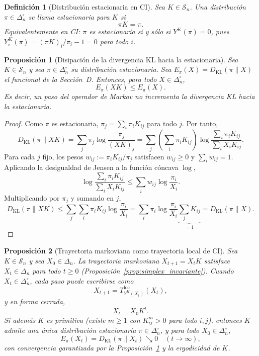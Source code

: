 ﻿\documentclass[12pt]{article}
\newtheorem{definicion}{Definición}[section]
\newtheorem{proposicion}{Proposición}[section]
\begin{document}
\begin{definicion}[Distribución estacionaria en CI]\label{def:estacionaria_CI}
Sea $K \in \mathcal{S}_n$. Una distribución $\pi \in \Delta_n^\circ$ se llama \emph{estacionaria} para $K$ si
\[
\pi K = \pi.
\]
Equivalentemente en CI: $\pi$ es estacionaria si y sólo si $Y^K(\pi) = 0$, pues $Y^K_i(\pi) = (\pi K)_i/\pi_i - 1 = 0$ para todo $i$.
\end{definicion}

\begin{proposicion}[Disipación de la divergencia KL hacia la estacionaria]\label{prop:disipacion_KL_markov}
Sea $K \in \mathcal{S}_n$ y sea $\pi \in \Delta_n^\circ$ su distribución estacionaria. Sea $E_\pi(X) = D_{\mathrm{KL}}(\pi \| X)$ el funcional de la Sección~D. Entonces, para todo $X \in \Delta_n^\circ$,
\[
E_\pi(XK) \leq E_\pi(X).
\]
Es decir, un paso del operador de Markov no incrementa la divergencia KL hacia la estacionaria.
\end{proposicion}

\begin{proof}
Como $\pi$ es estacionaria, $\pi_j = \sum_i \pi_i K_{ij}$ para todo $j$. Por tanto,
\[
D_{\mathrm{KL}}(\pi \| XK) = \sum_j \pi_j \log \frac{\pi_j}{(XK)_j} = \sum_j \left(\sum_i \pi_i K_{ij}\right) \log \frac{\sum_i \pi_i K_{ij}}{\sum_i X_i K_{ij}}.
\]
Para cada $j$ fijo, los pesos $w_{ij} := \pi_i K_{ij}/\pi_j$ satisfacen $w_{ij} \geq 0$ y $\sum_i w_{ij}=1$. Aplicando la desigualdad de Jensen a la función cóncava $\log$,
\[
\log \frac{\sum_i \pi_i K_{ij}}{\sum_i X_i K_{ij}} \leq \sum_i w_{ij} \log \frac{\pi_i}{X_i}.
\]
Multiplicando por $\pi_j$ y sumando en $j$,
\[
D_{\mathrm{KL}}(\pi\|XK) \leq \sum_j \sum_i \pi_i K_{ij} \log \frac{\pi_i}{X_i} = \sum_i \pi_i \log\frac{\pi_i}{X_i} \underbrace{\sum_j K_{ij}}_{=1} = D_{\mathrm{KL}}(\pi\|X).
\]
\end{proof}

\begin{proposicion}[Trayectoria markoviana como trayectoria local de CI]\label{prop:trayectoria_markov_CI}
Sea $K \in \mathcal{S}_n$ y sea $X_0 \in \Delta_n$. La trayectoria markoviana $X_{t+1} = X_t K$ satisface $X_t\in\Delta_n$ para todo $t\ge 0$ (Proposición~\ref{prop:simplex_invariante}). Cuando $X_t\in\Delta_n^\circ$, cada paso puede escribirse como
\[
X_{t+1} = T^{\mathrm{loc}}_{Y^K(X_t)}(X_t),
\]
y en forma cerrada,
\[
X_t = X_0 K^t.
\]
Si además $K$ es primitiva (existe $m\geq 1$ con $K^m_{ij}>0$ para todo $i,j$), entonces $K$ admite una única distribución estacionaria $\pi \in \Delta_n^\circ$, y para todo $X_0\in\Delta_n^\circ$,
\[
E_\pi(X_t) = D_{\mathrm{KL}}(\pi\|X_t) \searrow 0 \quad (t\to\infty),
\]
con convergencia garantizada por la Proposición~\ref{prop:disipacion_KL_markov} y la ergodicidad de $K$.
\end{proposicion}
\end{document}
